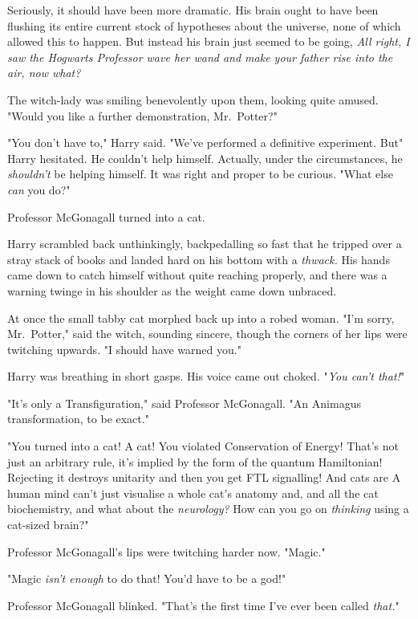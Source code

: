 Seriously, it should have been more dramatic. His brain ought to have been
flushing its entire current stock of hypotheses about the universe, none of
which allowed this to happen. But instead his brain just seemed to be going,
\emph{All right, I saw the Hogwarts Professor wave her wand and make your
father rise into the air, now what?}

The witch-lady was smiling benevolently upon them, looking quite amused. "Would
you like a further demonstration, Mr.~Potter?"

"You don't have to," Harry said. "We've performed a definitive experiment.
But{\el}" Harry hesitated. He couldn't help himself. Actually, under the
circumstances, he \emph{shouldn't} be helping himself. It was right and proper
to be curious. "What else \emph{can} you do?"

Professor McGonagall turned into a cat.

Harry scrambled back unthinkingly, backpedalling so fast that he tripped over a
stray stack of books and landed hard on his bottom with a \emph{thwack.} His
hands came down to catch himself without quite reaching properly, and there was
a warning twinge in his shoulder as the weight came down unbraced.

At once the small tabby cat morphed back up into a robed woman. "I'm sorry,
Mr.~Potter," said the witch, sounding sincere, though the corners of her lips
were twitching upwards. "I should have warned you."

Harry was breathing in short gasps. His voice came out choked. "\emph{You can't
 that!}"

"It's only a Transfiguration," said Professor McGonagall. "An Animagus
transformation, to be exact."

"You turned into a cat! A  cat! You violated Conservation of
Energy! That's not just an arbitrary rule, it's implied by the form of the
quantum Hamiltonian! Rejecting it destroys unitarity and then you get FTL
signalling! And cats are  A human mind can't just visualise
a whole cat's anatomy and, and all the cat biochemistry, and what about the
\emph{neurology?} How can you go on \emph{thinking} using a cat-sized brain?"

Professor McGonagall's lips were twitching harder now. "Magic."

"Magic \emph{isn't enough} to do that! You'd have to be a god!"

Professor McGonagall blinked. "That's the first time I've ever been called
\emph{that.}"

